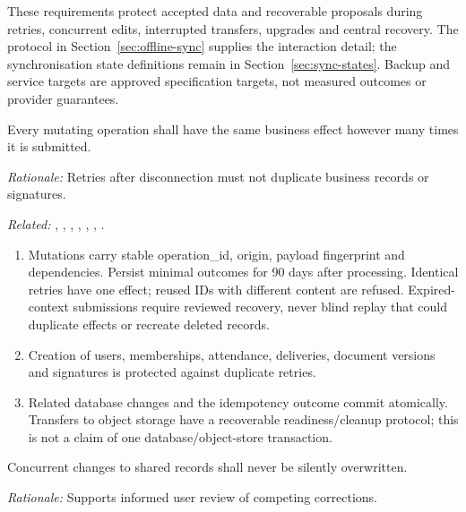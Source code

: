 \label{sec:nfr-reliability}
These requirements protect accepted data and recoverable proposals during retries,
concurrent edits, interrupted transfers, upgrades and central recovery. The protocol
in Section~\ref{sec:offline-sync} supplies the interaction detail; the synchronisation
state definitions remain in Section~\ref{sec:sync-states}. Backup and service targets
are approved specification targets, not measured outcomes or provider guarantees.

\label{nfr:REL-01}
Every mutating operation shall have the same business effect however many times it is submitted.

\textit{Rationale:} Retries after disconnection must not duplicate business records or signatures.

\textit{Related:} \hyperref[fr:001]{}, \hyperref[fr:003]{}, \hyperref[fr:006]{}, \hyperref[fr:029]{}, \hyperref[fr:041]{}, \hyperref[fr:043]{}, \hyperref[fr:048]{}.
\begin{enumerate}[label=(\alph*),leftmargin=*,itemsep=1pt,topsep=3pt]
\item Mutations carry stable operation\_id, origin, payload fingerprint and dependencies. Persist minimal outcomes for 90 days after processing. Identical retries have one effect; reused IDs with different content are refused. Expired-context submissions require reviewed recovery, never blind replay that could duplicate effects or recreate deleted records.
\item Creation of users, memberships, attendance, deliveries, document versions and signatures is protected against duplicate retries.
\item Related database changes and the idempotency outcome commit atomically. Transfers to object storage have a recoverable readiness/cleanup protocol; this is not a claim of one database/object-store transaction.
\end{enumerate}

\label{nfr:REL-02}
Concurrent changes to shared records shall never be silently overwritten.

\textit{Rationale:} Supports informed user review of competing corrections.

